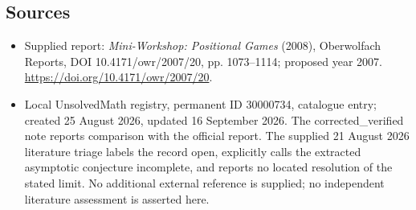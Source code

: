 \documentclass[11pt]{article}
\begin{document}
\subsection{Sources}
\begin{itemize}
\item Supplied report: \emph{Mini-Workshop: Positional Games} (2008), Oberwolfach Reports, DOI 10.4171/owr/2007/20, pp. 1073--1114; proposed year 2007. \url{https://doi.org/10.4171/owr/2007/20}.
\item Local UnsolvedMath registry, permanent ID 30000734, catalogue entry; created 25 August 2026, updated 16 September 2026. The corrected\_verified note reports comparison with the official report. The supplied 21 August 2026 literature triage labels the record open, explicitly calls the extracted asymptotic conjecture incomplete, and reports no located resolution of the stated limit. No additional external reference is supplied; no independent literature assessment is asserted here.
\end{itemize}
\end{document}
